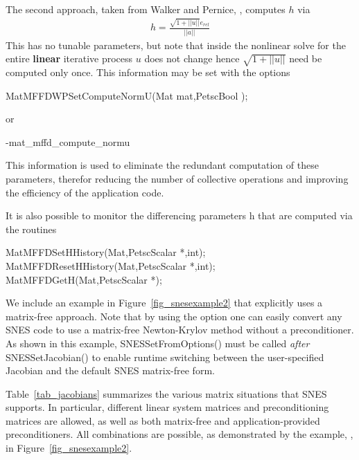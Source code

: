 The second approach, taken from Walker and Pernice, \cite{pw98}, computes $ h $ via
\begin{eqnarray*}
        h = \frac{\sqrt{1 + ||u||}e_{rel}}{||a||}
\end{eqnarray*}
This has no tunable parameters, but note that inside the nonlinear solve for 
the entire {\bf linear} iterative process $ u $ does not change hence
$\sqrt{1 + ||u||} $ need be computed only once. This information may be set with the 
options
\begin{tabbing}
  MatMFFDWPSetComputeNormU(Mat mat,PetscBool );
\end{tabbing}
or 
\begin{tabbing}
   -mat\_mffd\_compute\_normu 
\end{tabbing}
This information is used to eliminate the redundant computation of these parameters,
therefor reducing the number of collective operations and improving the efficiency of the 
application code.

It is also possible to monitor the differencing parameters h that are computed
via the routines
\begin{tabbing}
   MatMFFDSetHHistory(Mat,PetscScalar *,int);\\
   MatMFFDResetHHistory(Mat,PetscScalar *,int);\\
   MatMFFDGetH(Mat,PetscScalar *);\\
\end{tabbing}

We include an example in Figure~\ref{fig_snesexample2} that explicitly
uses a matrix-free approach.  Note that by using the option 
 one can easily convert any SNES code to use a matrix-free
Newton-Krylov method without a preconditioner.  As shown in this
example, SNESSetFromOptions() must be called {\em after}
SNESSetJacobian() to enable runtime switching between the
user-specified Jacobian and the default SNES matrix-free form.

Table~\ref{tab_jacobians} summarizes the various matrix situations
that SNES supports.  In particular, different linear system matrices
and preconditioning matrices are allowed, as well as both matrix-free
and application-provided preconditioners.  All combinations are
possible, as demonstrated by the example, 
,
 in Figure~\ref{fig_snesexample2}.

